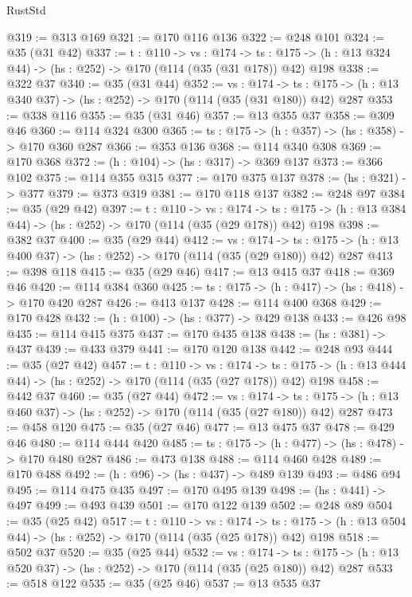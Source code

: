\begin{lexlean}{RustStd}
\begin{coremodule}
@319 := @313 @169
@321 := @170 @116 @136
@322 := @248 @101
@324 := @35 (@31 @42)
@337 := {t : @110} ->
  {vs : @174} ->
  {ts : @175} -> (h : @13 @324 @44) -> (hs : @252) -> @170 (@114 (@35 (@31 @178)) @42) @198
@338 := @322 @37
@340 := @35 (@31 @44)
@352 := {vs : @174} ->
  {ts : @175} -> (h : @13 @340 @37) -> (hs : @252) -> @170 (@114 (@35 (@31 @180)) @42) @287
@353 := @338 @116
@355 := @35 (@31 @46)
@357 := @13 @355 @37
@358 := @309 @46
@360 := @114 @324 @300
@365 := {ts : @175} -> (h : @357) -> (hs : @358) -> @170 @360 @287
@366 := @353 @136
@368 := @114 @340 @308
@369 := @170 @368
@372 := (h : @104) -> (hs : @317) -> @369 @137
@373 := @366 @102
@375 := @114 @355 @315
@377 := @170 @375 @137
@378 := (hs : @321) -> @377
@379 := @373 @319
@381 := @170 @118 @137
@382 := @248 @97
@384 := @35 (@29 @42)
@397 := {t : @110} ->
  {vs : @174} ->
  {ts : @175} -> (h : @13 @384 @44) -> (hs : @252) -> @170 (@114 (@35 (@29 @178)) @42) @198
@398 := @382 @37
@400 := @35 (@29 @44)
@412 := {vs : @174} ->
  {ts : @175} -> (h : @13 @400 @37) -> (hs : @252) -> @170 (@114 (@35 (@29 @180)) @42) @287
@413 := @398 @118
@415 := @35 (@29 @46)
@417 := @13 @415 @37
@418 := @369 @46
@420 := @114 @384 @360
@425 := {ts : @175} -> (h : @417) -> (hs : @418) -> @170 @420 @287
@426 := @413 @137
@428 := @114 @400 @368
@429 := @170 @428
@432 := (h : @100) -> (hs : @377) -> @429 @138
@433 := @426 @98
@435 := @114 @415 @375
@437 := @170 @435 @138
@438 := (hs : @381) -> @437
@439 := @433 @379
@441 := @170 @120 @138
@442 := @248 @93
@444 := @35 (@27 @42)
@457 := {t : @110} ->
  {vs : @174} ->
  {ts : @175} -> (h : @13 @444 @44) -> (hs : @252) -> @170 (@114 (@35 (@27 @178)) @42) @198
@458 := @442 @37
@460 := @35 (@27 @44)
@472 := {vs : @174} ->
  {ts : @175} -> (h : @13 @460 @37) -> (hs : @252) -> @170 (@114 (@35 (@27 @180)) @42) @287
@473 := @458 @120
@475 := @35 (@27 @46)
@477 := @13 @475 @37
@478 := @429 @46
@480 := @114 @444 @420
@485 := {ts : @175} -> (h : @477) -> (hs : @478) -> @170 @480 @287
@486 := @473 @138
@488 := @114 @460 @428
@489 := @170 @488
@492 := (h : @96) -> (hs : @437) -> @489 @139
@493 := @486 @94
@495 := @114 @475 @435
@497 := @170 @495 @139
@498 := (hs : @441) -> @497
@499 := @493 @439
@501 := @170 @122 @139
@502 := @248 @89
@504 := @35 (@25 @42)
@517 := {t : @110} ->
  {vs : @174} ->
  {ts : @175} -> (h : @13 @504 @44) -> (hs : @252) -> @170 (@114 (@35 (@25 @178)) @42) @198
@518 := @502 @37
@520 := @35 (@25 @44)
@532 := {vs : @174} ->
  {ts : @175} -> (h : @13 @520 @37) -> (hs : @252) -> @170 (@114 (@35 (@25 @180)) @42) @287
@533 := @518 @122
@535 := @35 (@25 @46)
@537 := @13 @535 @37

\end{coremodule}
\end{lexlean}
